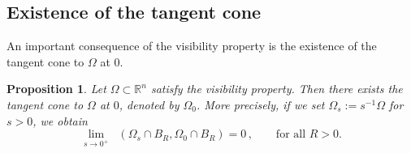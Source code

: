 \documentclass[a4paper,reqno,11pt]{amsart}
\newtheorem{proposition}[theorem]{Proposition}
\newcommand{\R}{\mathbb{R}}
\newcommand{\Hdist}{\mathop{\mathrm{dist}_{\mathcal{H}}}}
\newcommand{\loc}{\mathop{\mathrm{loc}}}
\newcommand{\ch}{\mathbf{1}}
\begin{document}
\subsection{Existence of the tangent cone}
An important consequence of the visibility property is the existence of the tangent cone to $\Omega$ at $0$.
	\begin{proposition} \label{prop:tangcone}
		Let $\Omega \subset \R^{n}$ satisfy the visibility property. Then there exists the tangent cone to $\Omega$ at $0$, denoted by $\Omega_{0}$. More precisely, if we set $\Omega_{s} := s^{-1} \Omega$ for $s > 0$, we obtain
		\begin{equation} \label{eq:tangcone}
			\lim_{s \rightarrow 0^{+}} \Hdist(\Omega_{s} \cap B_{R}, \Omega_{0} \cap B_{R}) = 0 \, , \qquad \text{for all $R > 0$.}
		\end{equation}
	\end{proposition}
\end{document}
